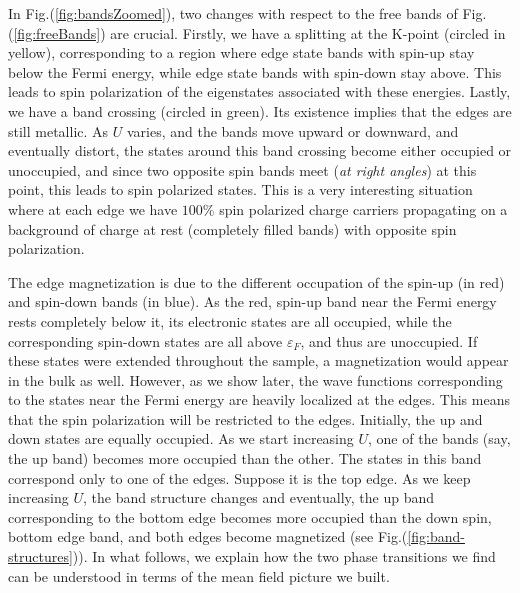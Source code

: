In Fig.(\ref{fig:bandsZoomed}), two changes with respect to the free bands of Fig.(\ref{fig:freeBands}) are crucial.
Firstly, we have a splitting at the K-point (circled in yellow), corresponding to a region where edge state bands with spin-up stay below the Fermi energy, while edge state bands with spin-down stay above.
This leads to spin polarization of the eigenstates associated with these energies.
Lastly, we have a band crossing (circled in green).
Its existence implies that the edges are still metallic.
As $U$ varies, and the bands move upward or downward, and eventually distort, the states around this band crossing become either occupied or unoccupied, and since two opposite spin bands meet (\emph{at right angles}) at this point, this leads to spin polarized states.
This is a very interesting situation where at each edge we have $100 \%$ spin polarized charge carriers propagating on a background of charge at rest (completely filled bands) with opposite spin polarization.

The edge magnetization is due to the different occupation of the spin-up (in red) and spin-down bands (in blue).
As the red, spin-up band near the Fermi energy rests completely below it, its electronic states are all occupied, while the corresponding spin-down states are all above $\varepsilon_F$, and thus are unoccupied.
If these states were extended throughout the sample, a magnetization would appear in the bulk as well.
However, as we show later, the wave functions corresponding to the states near the Fermi energy are heavily localized at the edges.
This means that the spin polarization will be restricted to the edges.
Initially, the up and down states are equally occupied.
As we start increasing $U$, one of the bands (say, the up band) becomes more occupied than the other.
The states in this band correspond only to one of the edges.
Suppose it is the top edge.
As we keep increasing $U$, the band structure changes and eventually, the up band corresponding to the bottom edge becomes more occupied than the down spin, bottom edge band, and both edges become magnetized (see Fig.(\ref{fig:band-structures})).
In what follows, we explain how the two phase transitions we find can be understood in terms of the mean field picture we built.

